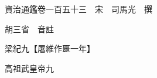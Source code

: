 










 


 
 


 

  
  
  
  
  





  
  
  
  
  
 
  

  

  
  
  



  

 
 

  
   




  

  
  


  　　資治通鑑卷一百五十三　宋　司馬光　撰

　　胡三省　音註

　　梁紀九【屠維作噩一年】

　　高祖武皇帝九


